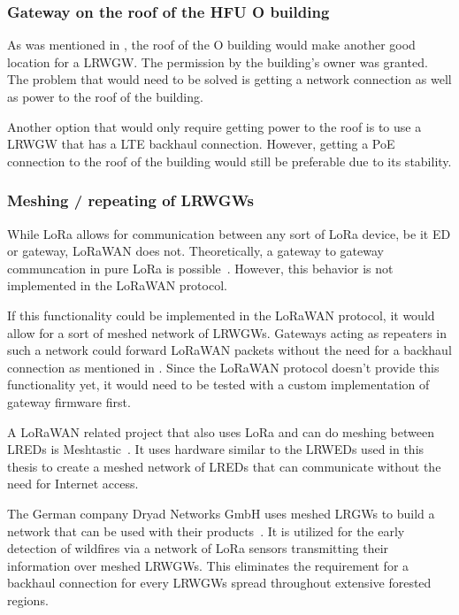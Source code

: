 \subsubsection{Gateway on the roof of the \acl{HFU} O building}

As was mentioned in , the roof of the O building would make another good location for a \acl{LRWGW}.
The permission by the building's owner was granted.
The problem that would need to be solved is getting a network connection as well as power to the roof of the building.

Another option that would only require getting power to the roof is to use a \acl{LRWGW} that has a \ac{LTE} backhaul connection.
However, getting a \ac{PoE} connection to the roof of the building would still be preferable due to its stability.

\subsubsection{Meshing / repeating of \aclp{LRWGW}}

While \ac{LoRa} allows for communication between any sort of \ac{LoRa} device, be it \acl{ED} or gateway, \ac{LoRaWAN} does not.
Theoretically, a gateway to gateway communcation in pure \ac{LoRa} is possible~\cite{dwijaksara_multihop_2019}.
However, this behavior is not implemented in the \ac{LoRaWAN} protocol.

If this functionality could be implemented in the \ac{LoRaWAN} protocol, it would allow for a sort of meshed network of \aclp{LRWGW}.
Gateways acting as repeaters in such a network could forward \ac{LoRaWAN} packets without the need for a backhaul connection as mentioned in .
Since the \ac{LoRaWAN} protocol doesn't provide this functionality yet, it would need to be tested with a custom implementation of gateway firmware first.

A \ac{LoRaWAN} related project that also uses \ac{LoRa} and can do meshing between \aclp{LRED} is Meshtastic~\cite{meshtastic_llc_meshtastic_2023}.
It uses hardware similar to the \aclp{LRWED} used in this thesis to create a meshed network of \aclp{LRED} that can communicate without the need for Internet access.

The German company Dryad Networks GmbH uses meshed \aclp{LRGW} to build a network that can be used with their products~\cite{dryad_networks_gmbh_silvanet_2023}.
It is utilized for the early detection of wildfires via a network of \ac{LoRa} sensors transmitting their information over meshed \aclp{LRWGW}.
This eliminates the requirement for a backhaul connection for every \aclp{LRWGW} spread throughout extensive forested regions.

